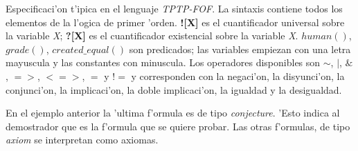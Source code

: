 Especificaci'on t'ipica en el lenguaje \textit{TPTP-FOF}. La sintaxis contiene todos los elementos de la l'ogica de primer 'orden. \textbf{![X]} es el cuantificador universal sobre la variable \textit{X}; \textbf{?[X]} es el cuantificador existencial sobre la variable \textit{X}. \textit{$human()$}, \textit{$grade()$}, \textit{$created\_equal()$} son predicados; las variables empiezan con una letra mayuscula y las constantes con minuscula. Los operadores disponibles son $\sim$, $|$, $\&$, $=>$, $<=>$, $=$ y $!=$ y corresponden con la negaci'on, la disyunci'on, la conjunci'on, la implicaci'on, la doble implicaci'on, la igualdad y la desigualdad.

En el ejemplo anterior la 'ultima f'ormula es de tipo \textit{conjecture}. 'Esto indica al demostrador que es la f'ormula que se quiere probar. Las otras f'ormulas, de tipo \textit{axiom} se interpretan como axiomas.
